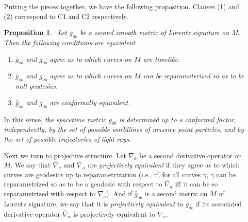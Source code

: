 \documentclass [12] {article}
\theoremstyle{plain}
\newtheorem{proposition}{Proposition}[subsection]
\numberwithin{figure}{subsection}
\numberwithin{proposition}{subsection}
\begin{document}
Putting the pieces together, we have the following proposition. Clauses (1) and (2) correspond to C1 and C2 respectively.
\begin{proposition} \label{conformal structure} 
\ Let $\bar{g}_{ab}$ be a second smooth metric of Lorentz signature on $M$. Then the following conditions  are equivalent.  
\vspace{-.5em}
\begin{enumerate}
\vspace{-.5em}
\item [(1)]  $\bar{g}_{ab}$ and $g_{ab}$ agree as to which curves on $M$ are timelike.   
\vspace{-.5em}
\item [(2)]  $\bar{g}_{ab}$ and $g_{ab}$ agree as to which curves on $M$ can be reparameterized so as to be null geodesics. 
 \vspace{-.5em}
\item [(3)] $\bar{g}_{ab}$ and $g_{ab}$ are conformally equivalent.
\vspace{-.5em}
\end{enumerate}
\end{proposition}
\noindent In this sense,   \emph{the spacetime metric $g_{ab}$ is determined up to a conformal factor, independently, by the set of possible worldlines of massive point particles, and by the  set of possible trajectories of  light rays.}   

Next we turn to projective structure. Let $\overline{\nabla}_a$ be a second derivative operator on $M$.  We say that $\overline{\nabla}_a$ and $\nabla_a$ are \emph{projectively equivalent} if they agree as to which curves are geodesics up to reparametrization (i.e., if, for all curves $\gamma$, $\gamma$ can be reparametrized so as to be a geodesic with respect to $\overline{\nabla}_a$ iff it can be so reparametrized with respect to $\nabla_a$).  And if $\bar{g}_{ab}$  is a second metric on $M$ of Lorentz signature, we say that it is \emph{projectively equivalent} to $g_{ab}$ if its associated derivative operator $\overline{\nabla}_a$ is projectively equivalent to $\nabla_a$.  
\end{document}
